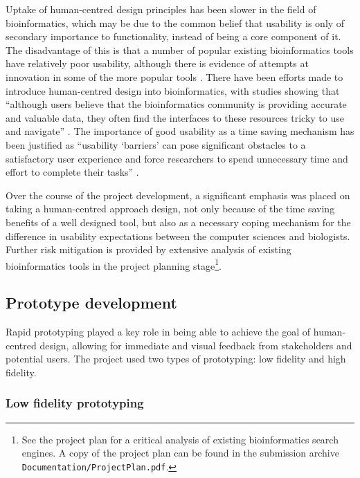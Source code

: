 Uptake of human-centred design principles has been slower in the field
of bioinformatics, which may be due to the common belief that
usability is only of secondary importance to functionality, instead of
being a core component of it. The disadvantage of this is that a
number of popular existing bioinformatics tools have relatively poor
usability, although there is evidence of attempts at innovation in
some of the more popular tools \cite{lu2011pubmed,
  hearst2007biotext}. There have been efforts made to introduce
human-centred design into bioinformatics, with studies showing that
``although users believe that the bioinformatics community is
providing accurate and valuable data, they often find the interfaces
to these resources tricky to use and navigate''
\cite{pavelin2012bioinformatics}. The importance of good usability as
a time saving mechanism has been justified as ``usability `barriers'
can pose significant obstacles to a satisfactory user experience and
force researchers to spend unnecessary time and effort to complete
their tasks'' \cite{bolchini2009better}.

Over the course of the project development, a significant emphasis was
placed on taking a human-centred approach design, not only because of
the time saving benefits of a well designed tool, but also as a
necessary coping mechanism for the difference in usability
expectations between the computer sciences and biologists. Further
risk mitigation is provided by extensive analysis of existing
bioinformatics tools in the project planning stage\footnote{See the
  project plan for a critical analysis of existing bioinformatics
  search engines. A copy of the project plan can be found in the
  submission archive \texttt{Documentation/ProjectPlan.pdf}.}.

\subsection{Prototype development}\label{subsec:prototype-development}

Rapid prototyping played a key role in being able to achieve the goal
of human-centred design, allowing for immediate and visual feedback
from stakeholders and potential users. The project used two types of
prototyping: low fidelity and high fidelity.

\subsubsection*{Low fidelity prototyping}

